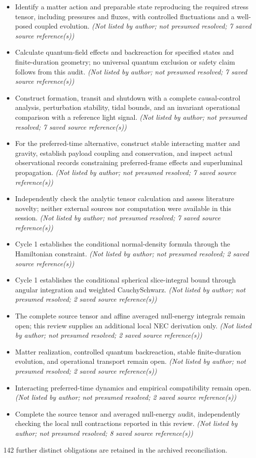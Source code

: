 \documentclass[11pt]{article}
\begin{document}
\begin{itemize}
\item Identify a matter action and preparable state reproducing the required stress tensor, including pressures and fluxes, with controlled fluctuations and a well-posed coupled evolution. \textit{ (Not listed by author; not presumed resolved; 7 saved source reference(s))}
\item Calculate quantum-field effects and backreaction for specified states and finite-duration geometry; no universal quantum exclusion or safety claim follows from this audit. \textit{ (Not listed by author; not presumed resolved; 7 saved source reference(s))}
\item Construct formation, transit and shutdown with a complete causal-control analysis, perturbation stability, tidal bounds, and an invariant operational comparison with a reference light signal. \textit{ (Not listed by author; not presumed resolved; 7 saved source reference(s))}
\item For the preferred-time alternative, construct stable interacting matter and gravity, establish payload coupling and conservation, and inspect actual observational records constraining preferred-frame effects and superluminal propagation. \textit{ (Not listed by author; not presumed resolved; 7 saved source reference(s))}
\item Independently check the analytic tensor calculation and assess literature novelty; neither external sources nor computation were available in this session. \textit{ (Not listed by author; not presumed resolved; 7 saved source reference(s))}
\item Cycle 1 establishes the conditional normal-density formula through the Hamiltonian constraint. \textit{ (Not listed by author; not presumed resolved; 2 saved source reference(s))}
\item Cycle 1 establishes the conditional spherical slice-integral bound through angular integration and weighted Cauchy\textendash{}Schwarz. \textit{ (Not listed by author; not presumed resolved; 2 saved source reference(s))}
\item The complete source tensor and affine averaged null-energy integrals remain open; this review supplies an additional local NEC derivation only. \textit{ (Not listed by author; not presumed resolved; 2 saved source reference(s))}
\item Matter realization, controlled quantum backreaction, stable finite-duration evolution, and operational transport remain open. \textit{ (Not listed by author; not presumed resolved; 2 saved source reference(s))}
\item Interacting preferred-time dynamics and empirical compatibility remain open. \textit{ (Not listed by author; not presumed resolved; 2 saved source reference(s))}
\item Complete the source tensor and averaged null-energy audit, independently checking the local null contractions reported in this review. \textit{ (Not listed by author; not presumed resolved; 8 saved source reference(s))}
\end{itemize}
142 further distinct obligations are retained in the archived reconciliation.
\end{document}
